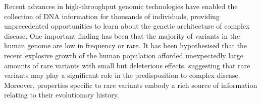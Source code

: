 



Recent advances in high-throughput genomic technologies have enabled the collection of DNA information for thousands of individuals, providing unprecedented opportunities to learn about the genetic architecture of complex disease.
One important finding has been that the majority of variants in the human genome are low in frequency or rare.
It has been hypothesised that the recent explosive growth of the human population afforded unexpectedly large amounts of rare variants with small but deleterious effects, suggesting that rare variants may play a significant role in the predisposition to complex disease.
Moreover, properties specific to rare variants embody a rich source of information relating to their evolutionary history.

